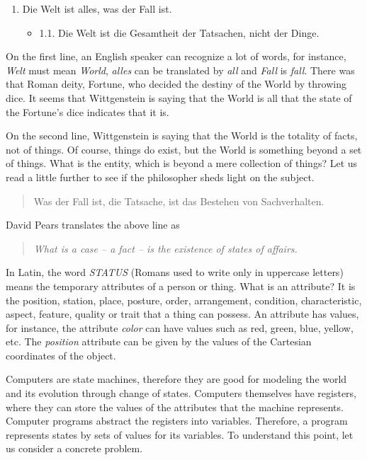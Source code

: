 \documentclass[
  12pt,
]{book}
\providecommand{\tightlist}{%
  \setlength{\itemsep}{0pt}\setlength{\parskip}{0pt}}
\begin{document}
\begin{enumerate}
\def\labelenumi{\arabic{enumi}.}
\tightlist
\item
  Die Welt ist alles, was der Fall ist.

  \begin{itemize}
  \tightlist
  \item
    1.1. Die Welt ist die Gesamtheit der Tatsachen, nicht der Dinge.
  \end{itemize}
\end{enumerate}

On the first line, an English speaker can recognize a lot of words, for
instance, \emph{Welt} must mean \emph{World}, \emph{alles} can be
translated by \emph{all} and \emph{Fall} is \emph{fall}. There was that
Roman deity, Fortune, who decided the destiny of the World by throwing
dice. It seems that Wittgenstein is saying that the World is all that
the state of the Fortune's dice indicates that it is.

On the second line, Wittgenstein is saying that the World is the
totality of facts, not of things. Of course, things do exist, but the
World is something beyond a set of things. What is the entity, which is
beyond a mere collection of things? Let us read a little further to see
if the philosopher sheds light on the subject.

\begin{quote}
Was der Fall ist, die Tatsache, ist das Bestehen von Sachverhalten.
\end{quote}

David Pears translates the above line as

\begin{quote}
\emph{What is a case -- a fact -- is the existence of states of
affairs.}
\end{quote}

In Latin, the word \emph{STATUS} (Romans used to write only in uppercase
letters) means the temporary attributes of a person or thing. What is an
attribute? It is the position, station, place, posture, order,
arrangement, condition, characteristic, aspect, feature, quality or
trait that a thing can possess. An attribute has values, for instance,
the attribute \emph{color} can have values such as red, green, blue,
yellow, etc. The \emph{position} attribute can be given by the values of
the Cartesian coordinates of the object.

Computers are state machines, therefore they are good for modeling the
world and its evolution through change of states. Computers themselves
have registers, where they can store the values of the attributes that
the machine represents. Computer programs abstract the registers into
variables. Therefore, a program represents states by sets of values for
its variables. To understand this point, let us consider a concrete
problem.
\end{document}
